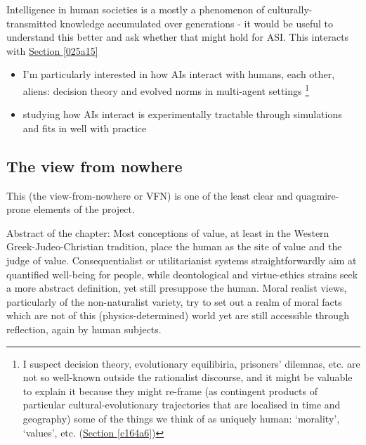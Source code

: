 \documentclass{article}
\begin{document}
Intelligence in human societies is a mostly a phenomenon of culturally-transmitted knowledge accumulated over generations - it would be useful to understand this better and ask whether that might hold for ASI.  This interacts with \hyperref[025a15]{Section \ref*{025a15}}
\begin{itemize}
\item I'm particularly interested in how AIs interact with humans, each other, aliens: decision theory and evolved norms in multi-agent settings \footnote{I suspect decision theory, evolutionary equilibiria, prisoners' dilemnas, etc. are not so well-known outside the rationalist discourse, and it might be valuable to explain it because they might re-frame (as contingent products of particular cultural-evolutionary trajectories that are localised in time and geography) some of the things we think of as uniquely human: `morality', `values', etc. \label{2a1f99} (\hyperref[c164a6]{Section \ref*{c164a6}}) }
\item studying how AIs interact is experimentally tractable through simulations and fits in well with practice
\end{itemize}


	


\subsection{The view from nowhere}

\label{f89d2e}

This (the view-from-nowhere or VFN) is one of the least clear and quagmire-prone elements of the project.

Abstract of the chapter:
Most conceptions of value, at least in the Western Greek-Judeo-Christian tradition, place the human as the site of value and the judge of value.  Consequentialist or utilitarianist systems straightforwardly aim at quantified well-being for people, while deontological and virtue-ethics strains seek a more abstract definition, yet still presuppose the human.  Moral realist views, particularly of the non-naturalist variety, try to set out a realm of moral facts which are not of this (physics-determined) world yet are still accessible through reflection, again by human subjects.
\end{document}
